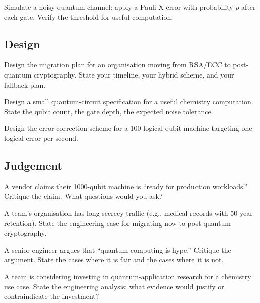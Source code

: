 \begin{exercise}
Simulate a noisy quantum channel: apply a Pauli-X error with probability $p$ after each gate. Verify the threshold for useful computation.
\end{exercise}

\subsection*{Design}

\begin{exercise}
Design the migration plan for an organisation moving from RSA/ECC to post-quantum cryptography. State your timeline, your hybrid scheme, and your fallback plan.
\end{exercise}

\begin{exercise}
Design a small quantum-circuit specification for a useful chemistry computation. State the qubit count, the gate depth, the expected noise tolerance.
\end{exercise}

\begin{exercise}
Design the error-correction scheme for a 100-logical-qubit machine targeting one logical error per second.
\end{exercise}

\subsection*{Judgement}

\begin{exercise}
A vendor claims their 1000-qubit machine is ``ready for production workloads.'' Critique the claim. What questions would you ask?
\end{exercise}

\begin{exercise}
A team's organisation has long-secrecy traffic (e.g., medical records with 50-year retention). State the engineering case for migrating now to post-quantum cryptography.
\end{exercise}

\begin{exercise}
A senior engineer argues that ``quantum computing is hype.'' Critique the argument. State the cases where it is fair and the cases where it is not.
\end{exercise}

\begin{exercise}
A team is considering investing in quantum-application research for a chemistry use case. State the engineering analysis: what evidence would justify or contraindicate the investment?
\end{exercise}


